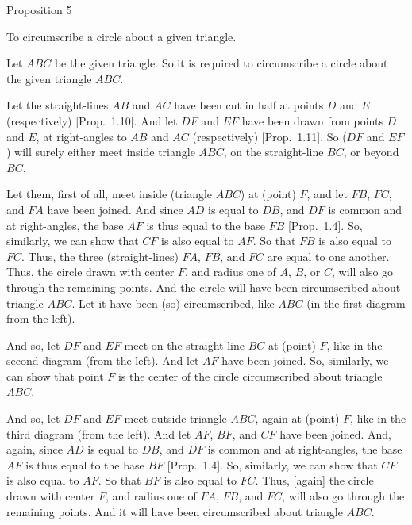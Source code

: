 
\begin{center}
{\large Proposition 5}
\end{center}

To circumscribe a circle about a given  triangle.

\epsfysize=1.05in
\centerline{}

Let $ABC$ be the given triangle. So it is required to circumscribe
a circle about the given triangle $ABC$.

Let the straight-lines $AB$ and $AC$ have been cut in half at points $D$ and $E$ (respectively) [Prop.~1.10]. And let $DF$ and $EF$ have been drawn from 
points $D$ and $E$, at right-angles to $AB$ and $AC$ (respectively) [Prop.~1.11].
So  ($DF$ and $EF$) will surely either meet inside triangle $ABC$, on the straight-line
$BC$, or beyond $BC$.

Let them, first of all, meet inside (triangle $ABC$) at (point) $F$, and let $FB$, 
$FC$, and $FA$ have been joined. And since $AD$ is equal to $DB$, and $DF$ is
common and at right-angles, the base $AF$ is thus equal to the base $FB$
[Prop.~1.4]. So, similarly, we can show that $CF$ is also equal to
$AF$. So that $FB$ is also equal to $FC$. Thus, the three (straight-lines)
$FA$, $FB$, and $FC$ are equal to one another. Thus, the circle drawn with
center $F$, and radius one of $A$, $B$, or $C$, will also go through the remaining points.
And the circle will have been circumscribed about triangle $ABC$. Let it
have been (so) circumscribed, like $ABC$ (in the first diagram from the left).

And so, let $DF$ and $EF$ meet on the straight-line $BC$ at (point) $F$, like
in the second diagram (from the left). And let $AF$ have been joined.
So, similarly, we can show that point $F$ is the center of the circle circumscribed about triangle $ABC$.

And so, let $DF$ and $EF$ meet outside triangle $ABC$, again at (point) $F$, like
in the third diagram (from the left). And let $AF$, $BF$, and $CF$ have been joined.
And, again, since $AD$ is equal to $DB$, and $DF$ is common and at right-angles,
the base $AF$ is thus equal to the base $BF$ [Prop.~1.4]. So, similarly,
we can show that $CF$ is also equal to $AF$. So that $BF$ is also equal to $FC$.
Thus, [again] the circle drawn with center $F$, and radius one of $FA$, $FB$, and
$FC$, will also go through the remaining points. And it will have been circumscribed
about triangle $ABC$.

